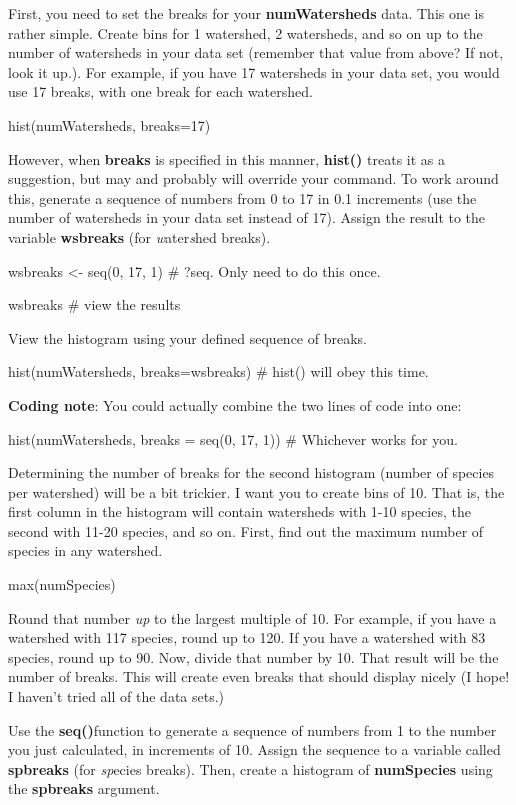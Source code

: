 First, you need to set the breaks for your \textbf{numWatersheds} data.
This one is rather simple. Create bins for 1 watershed, 2 watersheds,
and so on up to the number of watersheds in your data set (remember that
value from above? If not, look it up.). For example, if you have 17
watersheds in your data set, you would use 17 breaks, with one break for
each watershed.

hist(numWatersheds, breaks=17)

However, when \textbf{breaks} is specified in this manner,
\textbf{hist()} treats it as a suggestion, but may and probably will
override your command. To work around this, generate a sequence of
numbers from 0 to 17 in 0.1 increments (use the number of watersheds in
your data set instead of 17). Assign the result to the variable
\textbf{wsbreaks} (for \emph{w}ater\emph{s}hed breaks).

wsbreaks \textless{}- seq(0, 17, 1) \# ?seq. Only need to do this once.

wsbreaks \# view the results

View the histogram using your defined sequence of breaks.

hist(numWatersheds, breaks=wsbreaks) \# hist() will obey this time.

\textbf{Coding note}: You could actually combine the two lines of code
into one:

hist(numWatersheds, breaks = seq(0, 17, 1)) \# Whichever works for you.

Determining the number of breaks for the second histogram (number of
species per watershed) will be a bit trickier. I want you to create bins
of 10. That is, the first column in the histogram will contain
watersheds with 1-10 species, the second with 11-20 species, and so on.
First, find out the maximum number of species in any watershed.

max(numSpecies)

Round that number \emph{up} to the largest multiple of 10. For example,
if you have a watershed with 117 species, round up to 120. If you have a
watershed with 83 species, round up to 90. Now, divide that number by
10. That result will be the number of breaks. This will create even
breaks that should display nicely (I hope! I haven't tried all of the
data sets.)

Use the \textbf{seq()}function to generate a sequence of numbers from 1
to the number you just calculated, in increments of 10. Assign the
sequence to a variable called \textbf{spbreaks} (for \emph{sp}ecies
breaks). Then, create a histogram of \textbf{numSpecies} using the
\textbf{spbreaks} argument.

